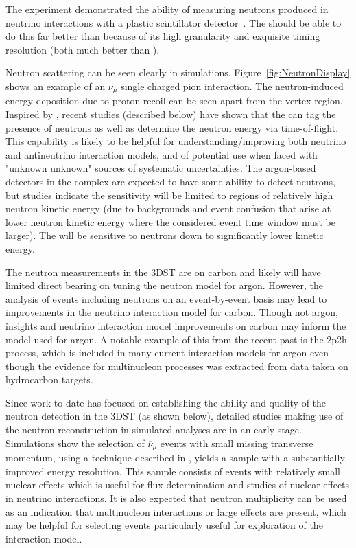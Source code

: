 The  experiment demonstrated the ability of measuring neutrons produced in neutrino interactions with a plastic scintillator detector~\cite{Elkins:2019vmy}. 
The  should be able to do this far better than  because of its high granularity and exquisite timing resolution (both much better than ). 

Neutron scattering can  be seen clearly in  simulations. 
Figure~\ref{fig:NeutronDisplay} shows an example of an
$\overline{\nu}_{\mu}$   single charged pion interaction. The neutron-induced energy deposition due to proton recoil can be seen apart from the vertex region. 
Inspired by , recent studies (described below) have shown that the  can tag the presence of neutrons as well as determine the neutron energy via time-of-flight. 
This capability is likely to be helpful for 
understanding/improving both neutrino and antineutrino interaction models, and of potential use when faced with "unknown unknown" sources of systematic uncertainties. The argon-based detectors in the  complex are expected to have some ability to detect neutrons, but studies indicate the sensitivity will be limited to regions of relatively high neutron kinetic energy (due to backgrounds and event confusion that arise at lower neutron kinetic energy where the considered event time window must be larger).  The  will be sensitive to neutrons down to significantly lower kinetic energy. 

The neutron measurements in the 3DST are on carbon and likely will have limited direct bearing on tuning the neutron model for argon.  However, the analysis of events including neutrons on an event-by-event basis may lead to improvements in the neutrino interaction model for carbon.  Though not argon, insights and neutrino interaction model improvements on carbon may inform the model used for argon.  A notable example of this from the recent past is the 2p2h process, which is included in many current interaction models for argon even though the evidence for multinucleon processes was 
 extracted from data taken on hydrocarbon targets.


Since work to date has focused on establishing the ability and quality of the neutron detection in the 3DST (as shown below), detailed studies making use of the neutron reconstruction in simulated analyses are in an early stage.  Simulations show the selection of $\overline{\nu}_\mu$  events with small missing transverse momentum, using a technique described in \cite{Abe:2018pwo}, yields a sample with a substantially improved energy resolution.  This sample consists of events with relatively small nuclear effects which is useful for flux determination and studies of nuclear effects in neutrino interactions.  It is also expected that neutron multiplicity can  be used as an indication that multinucleon interactions or large  effects are present, which may be helpful for selecting  events particularly useful for exploration of the interaction model.

